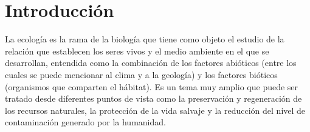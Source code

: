 \chapter*{Introducción}

La ecología es la rama de la biología que tiene como objeto el estudio de la relación que establecen los seres vivos y el medio ambiente en el que se desarrollan, entendida como la combinación de los factores abióticos (entre los cuales se puede mencionar al clima y a la geología) y los factores bióticos (organismos que comparten el hábitat). Es un tema muy amplio que puede ser tratado desde diferentes puntos de vista como la preservación y regeneración de los recursos naturales, la protección de la vida salvaje y la reducción del nivel de contaminación generado por la humanidad.

\newpage